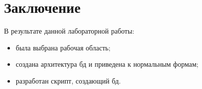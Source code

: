 \section{Заключение}

В результате данной лабораторной работы:
\begin{itemize}
    \item была выбрана рабочая область;
    \item создана архитектура бд и приведена к нормальным формам;
    \item разработан скрипт, создающий бд.
\end{itemize}